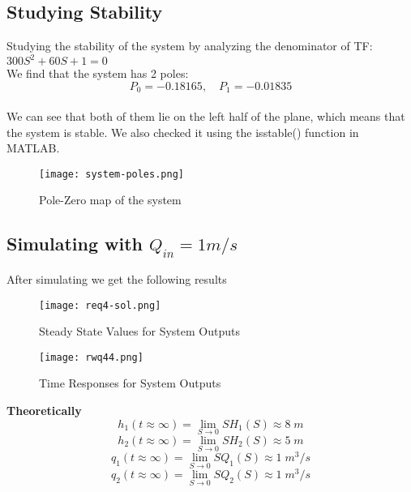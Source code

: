 \documentclass{report}
\begin{document}
\begin{flushleft}
\subsection*{Studying Stability}
Studying the stability of the system by analyzing the denominator of TF:
$
300 S^2 + 60S + 1=0$\\
We find that the system has 2 poles:\\
\[ P_{0} = -0.18165, \quad P_{1} = -0.01835 \]
\\ We can see that both of them lie on the left half of the plane, which means that the system is stable. We also
checked it using the isstable() function in MATLAB.
\begin{figure}[H]
    \centering
    \texttt{[image: system-poles.png]}
    \caption{Pole-Zero map of the system}
    \label{fig:system poles}
\end{figure}
\end{flushleft}
\newpage
\begin{flushleft}
\subsection*{Simulating with $Q_{in}=1m/s$}

After simulating we get the following results

\begin{figure}[H]
    \centering
    \texttt{[image: req4-sol.png]}
    \caption{Steady State Values for System Outputs}
    \label{fig:req-4}
\end{figure}


\begin{figure}[H]
    \centering
    \texttt{[image: rwq44.png]}
    \caption{Time Responses for System Outputs}
    \label{fig:req-4}
\end{figure}
\textbf{Theoretically}
\[
h_1(t\approx \infty) = \lim_{S\to0} SH_1(S) \approx 8\;m 
\]
\[
h_2(t\approx \infty) = \lim_{S\to0} SH_2(S) \approx 5\; m 
\]\[
q_1(t\approx \infty) = \lim_{S\to0} SQ_1(S) \approx 1\;m^3/s 
\]
\[
q_2(t\approx \infty) = \lim_{S\to0} SQ_2(S) \approx 1\;m^3/s
\]


\end{flushleft}
\end{document}

